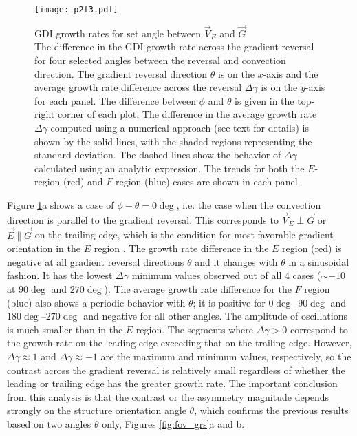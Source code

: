 \begin{figure}
	\centering
	\texttt{[image: p2f3.pdf]}
	\caption[GDI growth rates for set angle between \(\vec{V}_E\) and \(\vec{G}\)]{{\:}GDI growth rates for set angle between \(\vec{V}_E\) and \(\vec{G}\)\\ The difference in the GDI growth rate across the gradient reversal for four selected angles between the reversal and convection direction.  The gradient reversal direction \(\theta\) is on the \(x\)-axis and the average growth rate difference across the reversal \(\Delta\gamma\) is on the \(y\)-axis for each panel.  The difference between \(\phi\) and \(\theta\) is given in the top-right corner of each plot. The difference in the average growth rate \(\Delta\gamma\) computed using a numerical approach (see text for details) is shown by the solid lines, with the shaded regions representing the standard deviation.  The dashed lines show the behavior of \(\Delta\gamma\) calculated using an analytic expression. The trends for both the \(E\)-region (red) and \(F\)-region (blue) cases are shown in each panel.}
	\label{fig:set_angle}
\end{figure}



Figure \ref{fig:set_angle}a shows  a case of \(\phi-\theta=0\deg\), i.e. the case when the convection direction is parallel to the gradient reversal. This corresponds to \(\vec{V}_E \perp \vec{G}\) or \(\vec{E} \parallel \vec{G}\) on the trailing edge, which is the condition for most favorable gradient orientation in the \(E\) region \citep{Makarevich2014c}. The growth rate difference in the \(E\) region (red) is negative at all gradient reversal directions \(\theta\) and it changes with \(\theta\) in a sinusoidal fashion. It has the lowest \(\Delta\gamma\) minimum values observed out of all 4 cases (\(\sim-10\) at \(90\deg\) and \(270\deg\)). The average growth rate difference for the \(F\) region (blue) also shows a periodic behavior with \(\theta\); it is positive for \(0\deg\)--\(90\deg\) and \(180\deg\)--\(270\deg\) and negative for all other angles. The amplitude of oscillations is much smaller than in the \(E\) region. The segments where \(\Delta\gamma>0\) correspond to the growth rate on the leading edge exceeding that on the trailing edge. However, \(\Delta\gamma\approx 1\) and \(\Delta\gamma\approx -1\) are the maximum and minimum values, respectively, so the contrast across the gradient reversal is relatively small regardless of whether the leading or trailing edge has the greater growth rate. The important conclusion from this analysis is that the contrast or the asymmetry magnitude depends strongly on the structure orientation angle \(\theta\), which confirms the previous results based on two angles \(\theta\) only, Figures \ref{fig:fov_grs}a and b.


